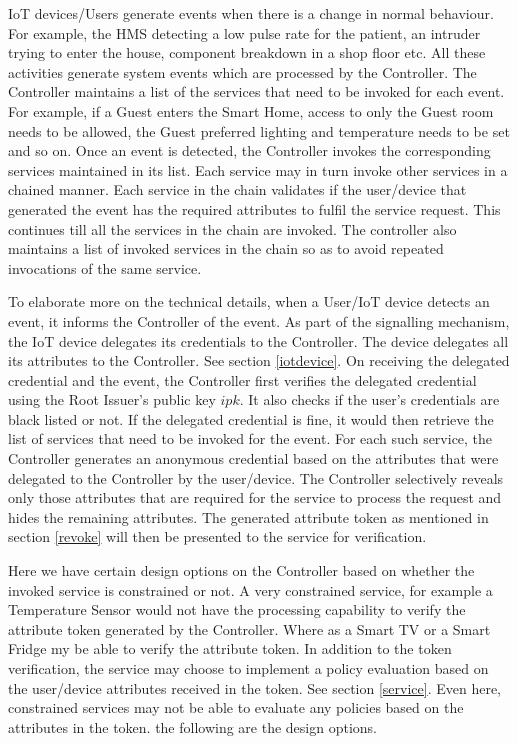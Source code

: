 \documentclass[journal]{IEEEtran}
\begin{document}
IoT devices/Users generate events when there is a change in normal behaviour. For example, the HMS detecting a low pulse rate for the patient, an intruder trying to enter the house, component breakdown in a shop floor etc. All these activities generate system events which are processed by the Controller. The Controller maintains a list of the services that need to be invoked for each event. For example, if a Guest enters the Smart Home, access to only the Guest room needs to be allowed, the Guest preferred lighting and temperature needs to be set and so on. Once an event is detected, the Controller invokes the corresponding services maintained in its list. Each service may in turn invoke other services in a chained manner. Each service in the chain validates if the user/device that generated the event has the required attributes to fulfil the service request. This continues till all the services in the chain are invoked. The controller also maintains a list of invoked services in the chain so as to avoid repeated invocations of the same service.

To elaborate more on the technical details, when a User/IoT device detects an event, it informs the Controller of the event. As part of the signalling mechanism, the IoT device delegates its credentials to the Controller. The device delegates all its attributes to the Controller. See section \ref{iotdevice}. On receiving the delegated credential and the event, the Controller first verifies the delegated credential using the Root Issuer's public key $ipk$. It also checks if the user's credentials are black listed or not. If the delegated credential is fine, it would then retrieve the list of services that need to be invoked for the event. For each such service, the Controller generates an anonymous credential based on the attributes that were delegated to the Controller by the user/device. The Controller selectively reveals only those attributes that are required for the service to process the request and hides the remaining attributes. The generated attribute token as mentioned in section \ref{revoke} will then be presented to the service for verification.

Here we have certain design options on the Controller based on whether the invoked service is constrained or not. A very constrained service, for example a Temperature Sensor would not have the processing capability to verify the attribute token generated by the Controller. Where as a Smart TV or a Smart Fridge my be able to verify the attribute token. In addition to the token verification, the service may choose to implement a policy evaluation based on the user/device attributes received in the token. See section \ref{service}. Even here, constrained services may not be able to evaluate any policies based on the attributes in the token. the following are the design options.
\end{document}
